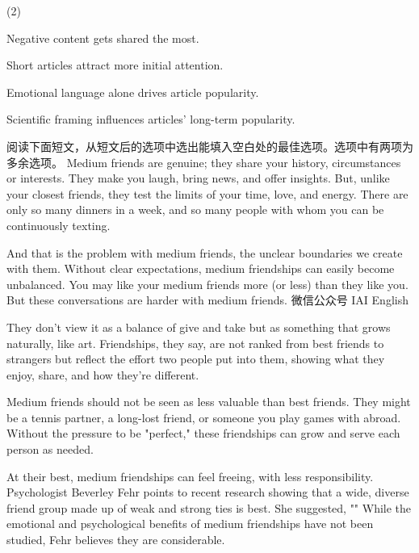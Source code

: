 \documentclass{英语试卷}
\begin{document}
\begin{choices}(2)
  \item Negative content gets shared the most.
  \item Short articles attract more initial attention.
  \item Emotional language alone drives article popularity.
  \item Scientific framing influences articles' long-term popularity.
\end{choices}
\par 阅读下面短文，从短文后的选项中选出能填入空白处的最佳选项。选项中有两项为多余选项。 Medium friends are genuine; they share your history, circumstances or interests. They make you laugh, bring news, and offer insights. But, unlike your closest friends, they test the limits of your time, love, and energy. There are only so many dinners in a week, and so many people with whom you can be continuously texting. \par
\par And that is the problem with medium friends, the unclear boundaries we create with them. Without clear expectations, medium friendships can easily become unbalanced. You may like your medium friends more (or less) than they like you.  But these conversations are harder with medium friends. 微信公众号 IAI English\par
\par {} They don't view it as a balance of give and take but as something that grows naturally, like art. Friendships, they say, are not ranked from best friends to strangers but reflect the effort two people put into them, showing what they enjoy, share, and how they're different.\par
\par Medium friends should not be seen as less valuable than best friends.  They might be a tennis partner, a long-lost friend, or someone you play games with abroad. Without the pressure to be "perfect," these friendships can grow and serve each person as needed.\par
\par At their best, medium friendships can feel freeing, with less responsibility. Psychologist Beverley Fehr points to recent research showing that a wide, diverse friend group made up of weak and strong ties is best. She suggested, "" While the emotional and psychological benefits of medium friendships have not been studied, Fehr believes they are considerable.\par
\end{document}
